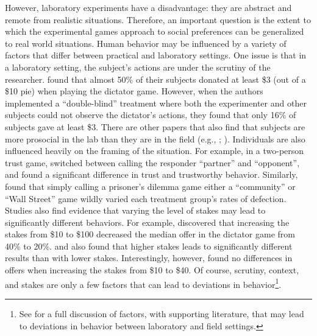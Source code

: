 \documentclass[12pt]{article}
\begin{document}
However, laboratory experiments have a disadvantage: they are abstract and remote from realistic situations. Therefore, an important question is the extent to which the experimental games approach to social preferences can be generalized to real world situations. Human behavior may be influenced by a variety of factors that differ between practical and laboratory settings. One issue is that in a laboratory setting, the subject's actions are under the scrutiny of the researcher. \cite{hoffman_1994} found that almost 50\% of their subjects donated at least \$3 (out of a \$10 pie) when playing the dictator game. However, when the authors implemented a ``double-blind'' treatment where both the experimenter and other subjects could not observe the dictator\rq s actions, they found that only 16\% of subjects gave at least \$3. There are other papers that also find that subjects are more prosocial in the lab than they are in the field (e.g., \cite{list_2006}; \cite{gneezy_2004}). Individuals are also influenced heavily on the framing of the situation. For example, in a two-person trust game, \cite{burnham_mccabe_smith_2000} switched between calling the responder ``partner'' and ``opponent'', and found a significant difference in trust and trustworthy behavior. Similarly, \cite{ross_ward_1996} found that simply calling a prisoner's dilemma game either a ``community'' or ``Wall Street'' game wildly varied each treatment group\rq s rates of defection. Studies also find evidence that varying the level of stakes may lead to significantly different behaviors. For example, \cite{carpenter_verhoogen_burks_2005} discovered that increasing the stakes from \$10 to \$100 decreased the median offer in the dictator game from 40\% to 20\%. \cite{slonim_roth_1998} and \cite{parco_rapoport_stein_2002} also found that higher stakes leads to significantly different results than with lower stakes. Interestingly, however, \cite{cherry_frykblom_shogren_2002} found no differences in offers when increasing the stakes from \$10 to \$40. Of course, scrutiny, context, and stakes are only a few factors that can lead to deviations in behavior\footnote{See \cite{levitt_list_2007} for a full discussion of factors, with supporting literature, that may lead to deviations in behavior between laboratory and field settings.}.
 
\end{document}
